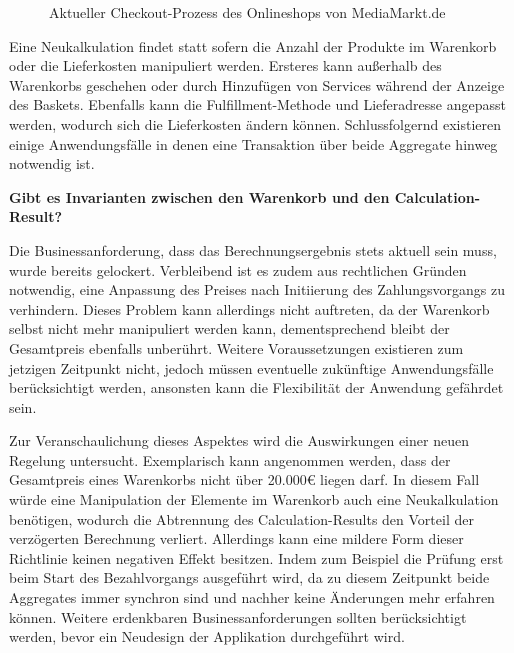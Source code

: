 \vspace{0.5cm}
\begin{figure}[htbp]
	\centering
	\caption{Aktueller Checkout-Prozess des Onlineshops von MediaMarkt.de}
	\label{fig:Checkout-Process}
\end{figure}

Eine Neukalkulation findet statt sofern die Anzahl der Produkte im Warenkorb oder die Lieferkosten manipuliert werden. Ersteres kann außerhalb des Warenkorbs geschehen oder durch Hinzufügen von Services während der Anzeige des Baskets. Ebenfalls kann die Fulfillment-Methode und Lieferadresse angepasst werden, wodurch sich die Lieferkosten ändern können. Schlussfolgernd existieren einige Anwendungsfälle in denen eine Transaktion über beide Aggregate hinweg notwendig ist.

\textbf{Gibt es Invarianten zwischen den Warenkorb und den Calculation-Result?}

Die Businessanforderung, dass das Berechnungsergebnis stets aktuell sein muss, wurde bereits gelockert. Verbleibend ist es zudem aus rechtlichen Gründen notwendig, eine Anpassung des Preises nach Initiierung des Zahlungsvorgangs zu verhindern. Dieses Problem kann allerdings nicht auftreten, da der Warenkorb selbst nicht mehr manipuliert werden kann, dementsprechend bleibt der Gesamtpreis ebenfalls unberührt. Weitere Voraussetzungen existieren zum jetzigen Zeitpunkt nicht, jedoch müssen eventuelle zukünftige Anwendungsfälle berücksichtigt werden, ansonsten kann die Flexibilität der Anwendung gefährdet sein. 

Zur Veranschaulichung dieses Aspektes wird die Auswirkungen einer neuen Regelung untersucht. Exemplarisch kann angenommen werden, dass der Gesamtpreis eines Warenkorbs nicht über 20.000€ liegen darf. In diesem Fall würde eine Manipulation der Elemente im Warenkorb auch eine Neukalkulation benötigen, wodurch die Abtrennung des Calculation-Results den Vorteil der verzögerten Berechnung verliert. Allerdings kann eine mildere Form dieser Richtlinie keinen negativen Effekt besitzen. Indem zum Beispiel die Prüfung erst beim Start des Bezahlvorgangs ausgeführt wird, da zu diesem Zeitpunkt beide Aggregates immer synchron sind und nachher keine Änderungen mehr erfahren können. Weitere erdenkbaren Businessanforderungen sollten berücksichtigt werden, bevor ein Neudesign der Applikation durchgeführt wird.

